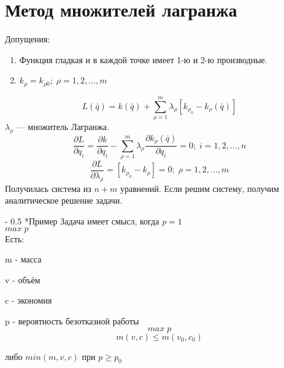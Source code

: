 \documentclass[12pt,a5paper]{scrbook}
\makeatletter
\renewcommand\paragraph{\@startsection{paragraph}{4}{0mm}%
{-\baselineskip} %
{0.5\baselineskip} %
{\normalfont\bfseries}}%
\makeatother
\begin{document}
  \section{Метод множителей лагранжа}
  Допущения:
  \begin{enumerate}
  	\item Функция гладкая и в каждой точке имеет 1-ю и 2-ю производные.
  	\item $k_\rho = k_{\rho0}; \; \rho = 1,2,\ldots,m$  		
  \end{enumerate}
  $$L(\bar{q}) = k(\bar{q}) + \sum_{\rho=1}^{m} \lambda_\rho[k_{\rho_0} - k_\rho(\bar{q})]$$
  $\lambda_\rho$ --- множитель Лагранжа.
  $$\frac{\partial L}{\partial q_i} = \frac{\partial k}{\partial q_i} - \sum_{\rho=1}^{m} \lambda_\rho \frac{\partial k_\rho(\bar{q})}{\partial q_i} = 0; \; i=1,2,\ldots,n$$
  $$\frac{\partial L}{\partial \lambda_\rho} = [k_{\rho_0} - k_\rho] = 0;\; \rho=1,2,\ldots,m$$
  Получилась система из $n+m$ уравнений. Если решим систему, получим аналитическое решение задачи.
  
  \paragraph*{Пример}
  Задача имеет смысл, когда $p=1$\\
  $max\; p$ \\
  Есть:\par
  m - масса \par
  v - объём \par
  c - экономия \par
  p - вероятность безотказной работы
  $$max\; p$$
  $$m(v,c) \leq m(v_0,c_0)$$
  \begin{center}
	либо $min(m,v,c)$ при $p \geq p_0$
  \end{center}
  
\end{document}
